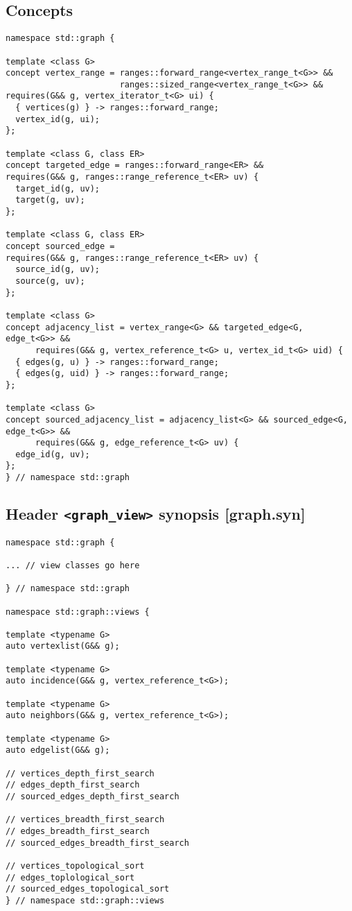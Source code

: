 \documentclass[10pt,onecolumn]{article}
\newcommand{\tcode}[1]{\lstinline[breaklines=true]{#1}}
\begin{document}
\subsection{Concepts}
\begin{lstlisting}
namespace std::graph {

template <class G>
concept vertex_range = ranges::forward_range<vertex_range_t<G>> && 
                       ranges::sized_range<vertex_range_t<G>> &&
requires(G&& g, vertex_iterator_t<G> ui) {
  { vertices(g) } -> ranges::forward_range;
  vertex_id(g, ui);
};

template <class G, class ER>
concept targeted_edge = ranges::forward_range<ER> && 
requires(G&& g, ranges::range_reference_t<ER> uv) {
  target_id(g, uv);
  target(g, uv);
};

template <class G, class ER>
concept sourced_edge = 
requires(G&& g, ranges::range_reference_t<ER> uv) {
  source_id(g, uv);
  source(g, uv);
};

template <class G>
concept adjacency_list = vertex_range<G> && targeted_edge<G, edge_t<G>> &&
      requires(G&& g, vertex_reference_t<G> u, vertex_id_t<G> uid) {
  { edges(g, u) } -> ranges::forward_range;
  { edges(g, uid) } -> ranges::forward_range;
};

template <class G>
concept sourced_adjacency_list = adjacency_list<G> && sourced_edge<G, edge_t<G>> &&
      requires(G&& g, edge_reference_t<G> uv) {
  edge_id(g, uv);
};
} // namespace std::graph
\end{lstlisting}


\subsection{Header \tcode{<graph_view>} synopsis [graph.syn]}

\begin{lstlisting}
namespace std::graph {

... // view classes go here

} // namespace std::graph

namespace std::graph::views {

template <typename G>
auto vertexlist(G&& g);

template <typename G>
auto incidence(G&& g, vertex_reference_t<G>);

template <typename G>
auto neighbors(G&& g, vertex_reference_t<G>);

template <typename G>
auto edgelist(G&& g);

// vertices_depth_first_search
// edges_depth_first_search
// sourced_edges_depth_first_search

// vertices_breadth_first_search
// edges_breadth_first_search
// sourced_edges_breadth_first_search

// vertices_topological_sort
// edges_toplological_sort
// sourced_edges_topological_sort
} // namespace std::graph::views
\end{lstlisting}
\end{document}
